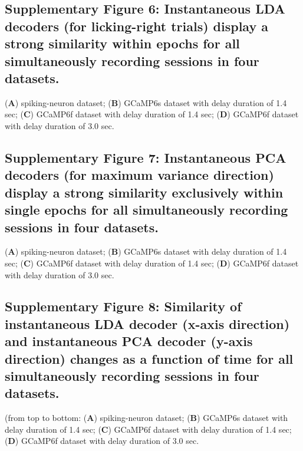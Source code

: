 \documentclass[12pt, oneside]{nature}
\begin{document}
\subsection{Supplementary Figure 6: Instantaneous LDA decoders (for licking-right trials) 
display a strong similarity within epochs for all simultaneously recording sessions in four datasets.} 
(\textbf{A}) spiking-neuron dataset; 
(\textbf{B}) GCaMP6s dataset with delay duration of 1.4 sec;
(\textbf{C}) GCaMP6f dataset with delay duration of 1.4 sec;
(\textbf{D}) GCaMP6f dataset with delay duration of 3.0 sec.

\subsection{Supplementary Figure 7: Instantaneous PCA decoders 
(for maximum variance direction) display a strong similarity 
exclusively within single epochs for all simultaneously recording sessions
in four datasets.} 
(\textbf{A}) spiking-neuron dataset; 
(\textbf{B}) GCaMP6s dataset with delay duration of 1.4 sec;
(\textbf{C}) GCaMP6f dataset with delay duration of 1.4 sec;
(\textbf{D}) GCaMP6f dataset with delay duration of 3.0 sec.

\subsection{Supplementary Figure 8: Similarity of instantaneous LDA decoder 
(x-axis direction) and instantaneous PCA decoder
(y-axis direction) changes as a function of time 
for all simultaneously recording sessions
in four datasets.} 
(from top to bottom:
(\textbf{A}) spiking-neuron dataset; 
(\textbf{B}) GCaMP6s dataset with delay duration of 1.4 sec;
(\textbf{C}) GCaMP6f dataset with delay duration of 1.4 sec;
(\textbf{D}) GCaMP6f dataset with delay duration of 3.0 sec.
\end{document}
